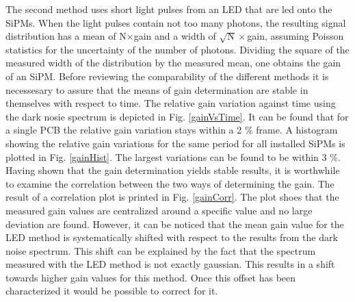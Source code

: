The second method uses short light pulses from an LED that are led onto the SiPMs. When the light pulses contain not too many photons, the resulting signal distribution has a mean of N$\times$gain and a width of $\sqrt{\text{N}}\times$gain, assuming Poisson statistics for the uncertainty of the number of photons. Dividing the square of the measured width of the distribution by the measured mean, one obtains the gain of an SiPM.
Before reviewing the comparability of the different methods it is necessesary to assure that the means of gain determination are stable in themselves with respect to time. The relative gain variation against time using the dark nosie spectrum is depicted in Fig. \ref{gainVsTime}. It can be found that for a single PCB the relative gain variation stays within a 2 \% frame. A histogram showing the relative gain variations for the same period for all installed SiPMs is plotted in Fig. \ref{gainHist}. The largest variations can be found to be within 3 \%. Having shown that the gain determination yields stable results, it is worthwhile to examine the correlation between the two ways of determining the gain. The result of a correlation plot is printed in Fig. \ref{gainCorr}. The plot shoes that the measured gain values are centralized around a specific value and no large deviation are found. However, it can be noticed that the mean gain value for the LED method is systematically shifted with respect to the results from the dark noise spectrum. This shift can be explained by the fact that the spectrum measured with the LED method is not exactly gaussian. This results in a shift towards higher gain values for this method. Once this offset has been characterized it would be possible to correct for it.

